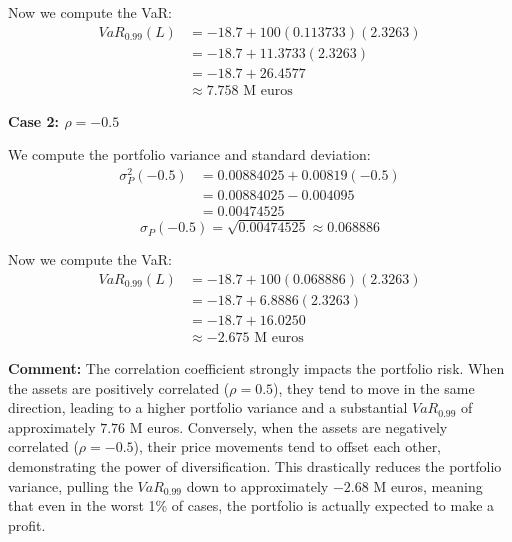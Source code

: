 Now we compute the VaR:
\begin{align*}
VaR_{0.99}(L) &= -18.7 + 100(0.113733)(2.3263) \\
&= -18.7 + 11.3733(2.3263) \\
&= -18.7 + 26.4577 \\
&\approx 7.758 \text{ M euros}
\end{align*}

\vspace{0.3cm}
\noindent \textbf{Case 2: $\rho = -0.5$}

We compute the portfolio variance and standard deviation:
\begin{align*}
\sigma_P^2(-0.5) &= 0.00884025 + 0.00819(-0.5) \\
&= 0.00884025 - 0.004095 \\
&= 0.00474525
\end{align*}
\begin{equation*}
\sigma_P(-0.5) = \sqrt{0.00474525} \approx 0.068886
\end{equation*}

Now we compute the VaR:
\begin{align*}
VaR_{0.99}(L) &= -18.7 + 100(0.068886)(2.3263) \\
&= -18.7 + 6.8886(2.3263) \\
&= -18.7 + 16.0250 \\
&\approx -2.675 \text{ M euros}
\end{align*}

\vspace{0.3cm}
\noindent \textbf{Comment:} 
The correlation coefficient strongly impacts the portfolio risk. When the assets are positively correlated ($\rho=0.5$), they tend to move in the same direction, leading to a higher portfolio variance and a substantial $VaR_{0.99}$ of approximately $7.76$ M euros. Conversely, when the assets are negatively correlated ($\rho=-0.5$), their price movements tend to offset each other, demonstrating the power of diversification. This drastically reduces the portfolio variance, pulling the $VaR_{0.99}$ down to approximately $-2.68$ M euros, meaning that even in the worst 1\% of cases, the portfolio is actually expected to make a profit.